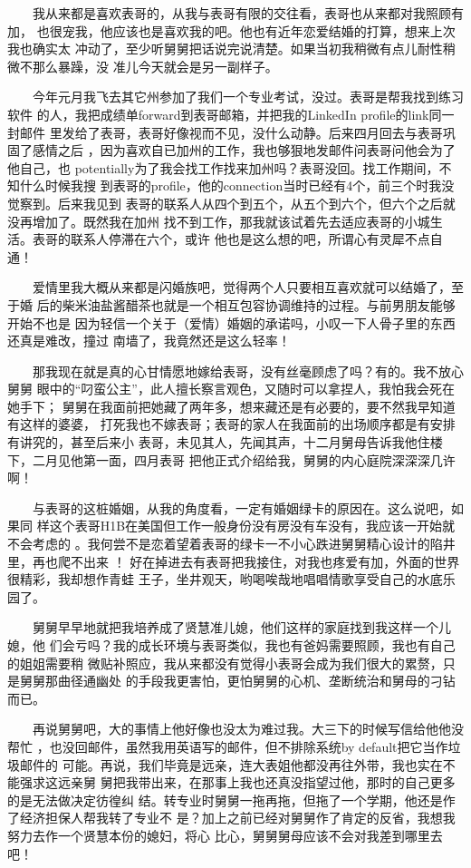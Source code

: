 \documentclass[12pt]{book}
\begin{document}
　　我从来都是喜欢表哥的，从我与表哥有限的交往看，表哥也从来都对我照顾有加，
也很宠我，他应该也是喜欢我的吧。他也有近年恋爱结婚的打算，想来上次我也确实太
冲动了，至少听舅舅把话说完说清楚。如果当初我稍微有点儿耐性稍微不那么暴躁，没
准儿今天就会是另一副样子。

　　今年元月我飞去其它州参加了我们一个专业考试，没过。表哥是帮我找到练习软件
的人，我把成绩单forward到表哥邮箱，并把我的LinkedIn profile的link同一封邮件
里发给了表哥，表哥好像视而不见，没什么动静。后来四月回去与表哥巩固了感情之后
，因为喜欢自已加州的工作，我也够狠地发邮件问表哥问他会为了他自己，也
potentially为了我会找工作找来加州吗？表哥没回。找工作期间，不知什么时候我搜
到表哥的profile，他的connection当时已经有4个，前三个时我没觉察到。后来我见到
表哥的联系人从四个到五个，从五个到六个，但六个之后就没再增加了。既然我在加州
找不到工作，那我就该试着先去适应表哥的小城生活。表哥的联系人停滞在六个，或许
他也是这么想的吧，所谓心有灵犀不点自通！

　　爱情里我大概从来都是闪婚族吧，觉得两个人只要相互喜欢就可以结婚了，至于婚
后的柴米油盐酱醋茶也就是一个相互包容协调维持的过程。与前男朋友能够开始不也是
因为轻信一个关于（爱情）婚姻的承诺吗，小叹一下人骨子里的东西还真是难改，撞过
南墙了，我竟然还是这么轻率！

　　那我现在就是真的心甘情愿地嫁给表哥，没有丝毫顾虑了吗？有的。我不放心舅舅
眼中的“叼蛮公主”，此人擅长察言观色，又随时可以拿捏人，我怕我会死在她手下；
舅舅在我面前把她藏了两年多，想来藏还是有必要的，要不然我早知道有这样的婆婆，
打死我也不嫁表哥；表哥的家人在我面前的出场顺序都是有安排有讲究的，甚至后来小
表哥，未见其人，先闻其声，十二月舅母告诉我他住楼下，二月见他第一面，四月表哥
把他正式介绍给我，舅舅的内心庭院深深深几许啊！

　　与表哥的这桩婚姻，从我的角度看，一定有婚姻绿卡的原因在。这么说吧，如果同
样这个表哥H1B在美国但工作一般身份没有房没有车没有，我应该一开始就不会考虑的
。我何尝不是恋着望着表哥的绿卡一不小心跌进舅舅精心设计的陷井里，再也爬不出来
！ 好在掉进去有表哥把我接住，对我也疼爱有加，外面的世界很精彩，我却想作青蛙
王子，坐井观天，哟喝唉哉地唱唱情歌享受自己的水底乐园了。

　　舅舅早早地就把我培养成了贤慧准儿媳，他们这样的家庭找到我这样一个儿媳，他
们会亏吗？我的成长环境与表哥类似，我也有爸妈需要照顾，我也有自己的姐姐需要稍
微贴补照应，我从来都没有觉得小表哥会成为我们很大的累赘，只是舅舅那曲径通幽处
的手段我更害怕，更怕舅舅的心机、垄断统治和舅母的刁钻而已。

　　再说舅舅吧，大的事情上他好像也没太为难过我。大三下的时候写信给他他没帮忙
，也没回邮件，虽然我用英语写的邮件，但不排除系统by default把它当作垃圾邮件的
可能。再说，我们毕竟是远亲，连大表姐他都没再往外带，我也实在不能强求这远亲舅
舅把我带出来，在那事上我也还真没指望过他，那时的自己更多的是无法做决定彷徨纠
结。转专业时舅舅一拖再拖，但拖了一个学期，他还是作了经济担保人帮我转了专业不
是？加上之前已经对舅舅作了肯定的反省，我想我努力去作一个贤慧本份的媳妇，将心
比心，舅舅舅母应该不会对我差到哪里去吧！
\end{document}
